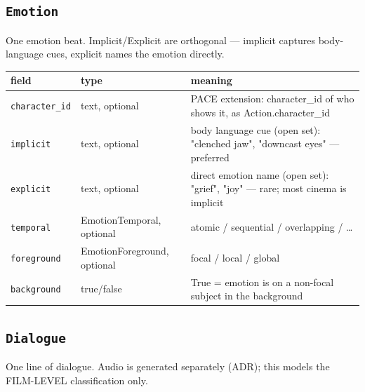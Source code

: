 \subsection*{\texttt{Emotion}}
\noindent One emotion beat. Implicit/\allowbreak{}Explicit are orthogonal ---\allowbreak{} implicit captures body-language cues, explicit names the emotion directly.

\begin{longtable}{@{}R{0.24\textwidth}R{0.21\textwidth}R{0.49\textwidth}@{}}
\toprule \textbf{field} & \textbf{type} & \textbf{meaning} \\ \midrule
\endhead
\texttt{character\_\allowbreak id} & text, optional & PACE extension: character\_\allowbreak id of who shows it, as Action.character\_\allowbreak id \\
\texttt{implicit} & text, optional & body language cue (open set): "clenched jaw", "downcast eyes" ---\allowbreak{} preferred \\
\texttt{explicit} & text, optional & direct emotion name (open set): "grief", "joy" ---\allowbreak{} rare; most cinema is implicit \\
\texttt{temporal} & EmotionTemporal, optional & atomic /\allowbreak{} sequential /\allowbreak{} overlapping /\allowbreak{} \ldots{} \\
\texttt{foreground} & EmotionForeground, optional & focal /\allowbreak{} local /\allowbreak{} global \\
\texttt{background} & true/\allowbreak{}false & True = emotion is on a non-focal subject in the background \\
\bottomrule
\end{longtable}

\subsection*{\texttt{Dialogue}}
\noindent One line of dialogue. Audio is generated separately (ADR); this models the FILM-LEVEL classification only.

